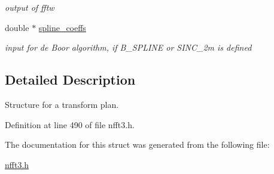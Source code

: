 \begin{CompactItemize}
\begin{CompactList}\small\item\em output of fftw \item\end{CompactList}\item 
\hypertarget{structnfct__plan_o26}{
double $\ast$ \hyperlink{structnfct__plan_o26}{spline\_\-coeffs}}
\label{structnfct__plan_o26}

\begin{CompactList}\small\item\em input for de Boor algorithm, if B\_\-SPLINE or SINC\_\-2m is defined \item\end{CompactList}\end{CompactItemize}


\subsection{Detailed Description}
Structure for a transform plan. 



Definition at line 490 of file nfft3.h.

The documentation for this struct was generated from the following file:\begin{CompactItemize}
\item 
\hyperlink{nfft3_8h}{nfft3.h}\end{CompactItemize}
